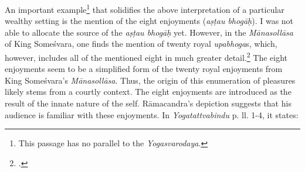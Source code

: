 An important example\footnote{This passage has no parallel to the \textit{Yogasvarodaya}.} that solidifies the above interpretation of a particular wealthy setting is the mention of the eight enjoyments (\textit{aṣṭau bhogāḥ}). I was not able to allocate the source of the \textit{aṣṭau bhogāḥ} yet. However, in the \textit{Mānasollāsa} of King Someśvara, one finds the mention of twenty royal \textit{upabhoga}s, which, however, includes all of the mentioned eight in much greater detail.\footnote{\citeauthor[1939: 5]{manasollasa}.} The eight enjoyments seem to be a simplified form of the twenty royal enjoyments from King Someśvara's \emph{Mānasollāsa}. Thus, the origin of this enumeration of pleasures likely stems from a courtly context. The eight enjoyments are introduced as the result of the innate nature of the self. Rāmacandra's depiction suggests that his audience is familiar with these enjoyments. In \emph{Yogatattvabindu}  p.\pageref{eightenjoy} ll. 1-4, it states:


